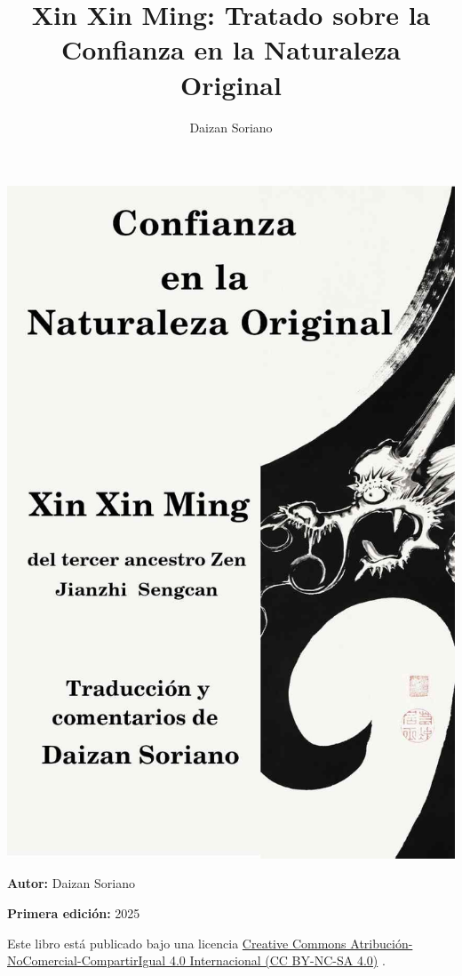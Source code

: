 \documentclass[
  a5paperpaper,
]{article}
\title{Xin Xin Ming: Tratado sobre la Confianza en la Naturaleza Original}
\author{Daizan Soriano}
\date{}
\begin{document}
\maketitle

{
\setcounter{tocdepth}{1}
\tableofcontents
}
\newpage

\begin{center}\textbf{}\end{center}

\includegraphics{../img/portada.jpg}

\textbf{Autor:} Daizan Soriano

\textbf{Primera edición:} 2025

Este libro está publicado bajo una licencia
\href{https://creativecommons.org/licenses/by-nc-sa/4.0/deed.es}{Creative
Commons Atribución-NoComercial-CompartirIgual 4.0 Internacional (CC
BY-NC-SA 4.0)} .
\end{document}

